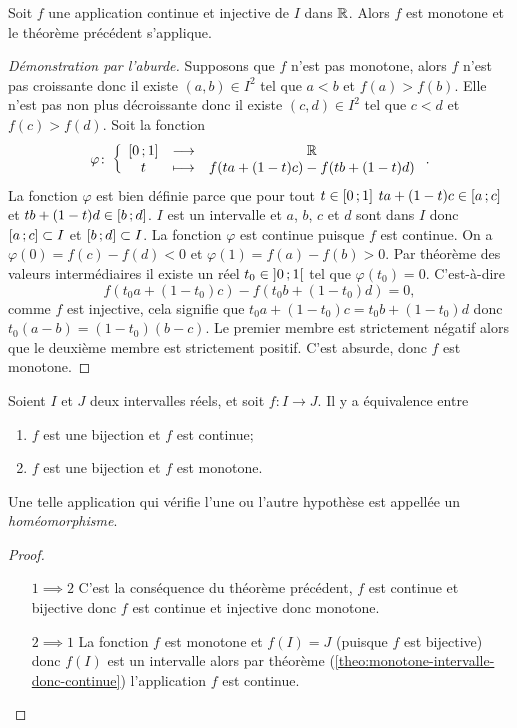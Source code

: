 \begin{theo}
  Soit $f$ une application continue et injective de $I$ dans $\mathbb{R}$. Alors $f$ est monotone et le théorème précédent s'applique.
\end{theo}
\begin{proof}[Démonstration par l'aburde]
  Supposons que $f$ n'est pas monotone, alors $f$ n'est pas croissante donc il existe $(a,b) \in I^2$ tel que $a < b$ et $f(a) > f(b)$. Elle n'est pas non plus décroissante donc il existe $(c,d) \in I^2$ tel que $c < d$ et $f(c) > f(d)$. Soit la fonction
  \begin{equation}
    \varphi\colon \left\{\begin{array}{ccc} \left[ 0 \, ;  1 \right] & \longrightarrow &\mathbb{R}\\ t & \longmapsto & f(ta+(1-t)c)-f(tb+(1-t)d) \end{array} \right..
  \end{equation}
  La fonction $\varphi$ est bien définie parce que pour tout $t \in \left[ 0 \, ;  1 \right]$ $ta+(1-t)c \in \left[ a \, ;  c \right]$ et $tb+(1-t)d \in \left[ b \, ;  d \right]$. $I$ est un intervalle et $a$, $b$, $c$ et $d$ sont dans $I$ donc $\left[ a \, ;  c \right] \subset I$ et $\left[ b \, ;  d \right] \subset I$. La fonction $\varphi$ est continue puisque $f$ est continue. On a $\varphi(0)=f(c)-f(d) <0$ et $\varphi(1)=f(a)-f(b) >0$. Par théorème des valeurs intermédiaires il existe un réel $t_0 \in \left] 0 \, ;  1 \right[$ tel que $\varphi(t_0)=0$. C'est-à-dire
\begin{equation}
  f(t_0a+(1-t_0)c)-f(t_0b+(1-t_0)d)=0,
\end{equation}
comme $f$ est injective, cela signifie que $t_0a+(1-t_0)c=t_0b+(1-t_0)d$ donc $t_0(a-b)=(1-t_0)(b-c)$. Le premier membre est strictement négatif alors que le deuxième membre est strictement positif. C'est absurde, donc $f$ est monotone.
\end{proof}
\begin{cor}
  Soient $I$ et $J$ deux intervalles réels, et soit $f:I\longrightarrow J$. Il y a équivalence entre
  \begin{enumerate}
  \item $f$ est une bijection et $f$ est continue;
  \item $f$ est une bijection et $f$ est monotone.
  \end{enumerate}
  Une telle application qui vérifie l'une ou l'autre hypothèse est appellée un \emph{homéomorphisme}.
\end{cor}
\begin{proof}
  \begin{itemize}
  \item[$1 \implies 2$] C'est la conséquence du théorème précédent, $f$ est continue et bijective donc $f$ est continue et injective donc monotone.
  \item[$2 \implies 1$] La fonction $f$ est monotone et $f(I)=J$ (puisque $f$ est bijective) donc $f(I)$ est un intervalle alors par théorème (\ref{theo:monotone-intervalle-donc-continue}) l'application $f$ est continue.
  \end{itemize}
\end{proof}

